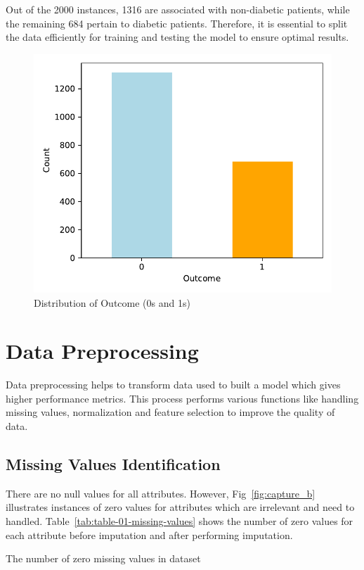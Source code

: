 Out of the 2000 instances, 1316 are associated with non-diabetic patients, while the remaining 684 pertain to diabetic patients. Therefore, it is essential to split the data efficiently for training and testing the model to ensure optimal results.
\begin{figure}[ht]
    \centering    \includegraphics[scale=0.8]{figures/data_distribution.pdf}
    \caption{Distribution of Outcome (0s and 1s)}
    \label{fig:capture_e}
\end{figure}


\section{Data Preprocessing}
Data preprocessing helps to transform data used to built a model which gives higher performance metrics. This process performs various functions like handling missing values, normalization and feature selection to improve the quality of data.

\subsection{Missing Values Identification}
There are no null values for all attributes. However, Fig~\ref{fig:capture_b} illustrates instances of zero values for attributes which are irrelevant and need to handled. Table~\ref{tab:table-01-missing-values} shows the number of zero values for each attribute before imputation and after performing imputation.

 \begin{table}[ht!]
    \centering
    \caption{The number of zero missing values in dataset}
    
    \label{tab:table-01-missing-values}
\end{table}

